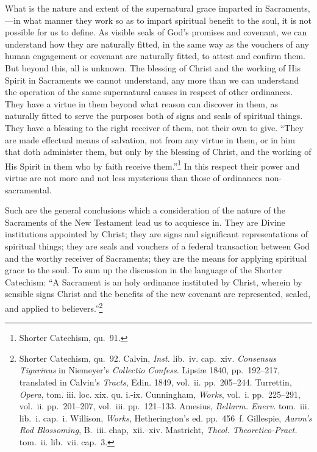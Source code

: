 \documentclass[english,]{book}
\begin{document}
What is the nature and extent of the supernatural grace imparted in Sacraments,---in what manner they work so as to impart spiritual benefit to the soul, it is not possible for us to define. As visible seals of God's promises and covenant, we can understand how they are naturally fitted, in the same way as the vouchers of any human engagement or covenant are naturally fitted, to attest and confirm them. But beyond this, all is unknown. The blessing of Christ and the working of His Spirit in Sacraments we cannot understand, any more than we can understand the operation of the same supernatural causes in respect of other ordinances. They have a virtue in them beyond what reason can discover in them, as naturally fitted to serve the purposes both of signs and seals of spiritual things. They have a blessing to the right receiver of them, not their own to give. ``They are made effectual means of salvation, not from any virtue in them, or in him that doth administer them, but only by the blessing of Christ, and the working of His Spirit in them who by faith receive them.''\footnote{Shorter Catechism, qu.~91.} In this respect their power and virtue are not more and not less mysterious than those of ordinances non-sacramental.

Such are the general conclusions which a consideration of the nature of the Sacraments of the New Testament lead us to acquiesce in. They are Divine institutions appointed by Christ; they are signs and significant representations of spiritual things; they are seals and vouchers of a federal transaction between God and the worthy receiver of Sacraments; they are the means for applying spiritual grace to the soul. To sum up the discussion in the language of the Shorter Catechism: ``A Sacrament is an holy ordinance instituted by Christ, wherein by sensible signs Christ and the benefits of the new covenant are represented, sealed, and applied to believers.''\footnote{Shorter Catechism, qu.~92. Calvin, \emph{Inst.} lib.~iv. cap.~xiv. \emph{Consensus Tigurinus} in Niemeyer's \emph{Collectio Confess.} Lipsiæ 1840, pp.~192--217, translated in Calvin's \emph{Tracts}, Edin. 1849, vol.~ii. pp.~205--244. Turrettin, \emph{Opera}, tom. iii. loc. xix. qu. i.-ix. Cunningham, \emph{Works}, vol.~i. pp.~225--291, vol.~ii. pp.~201--207, vol.~iii. pp.~121--133. Amesius, \emph{Bellarm. Enerv.} tom.~iii. lib.~i. cap.~i. Willison, \emph{Works}, Hetherington's ed. pp.~456~f. Gillespie, \emph{Aaron's Rod Blossoming}, B.~iii. chap,~xii.--xiv. Mastricht, \emph{Theol. Theoretico-Pract.} tom.~ii. lib.~vii. cap.~3.}
\end{document}
